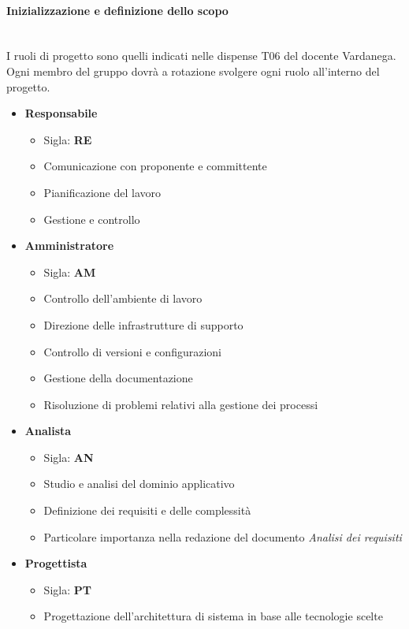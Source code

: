 \paragraph{Inizializzazione e definizione dello scopo}
\mbox{}\\
I ruoli di progetto sono quelli indicati nelle dispense T06 del docente Vardanega.
Ogni membro del gruppo dovrà a rotazione svolgere ogni ruolo all'interno del progetto.
\begin{itemize}
    \item \textbf{Responsabile}
    \begin{itemize}
        \item Sigla: \textbf{RE}
        \item Comunicazione con proponente e committente
        \item Pianificazione del lavoro
        \item Gestione e controllo
    \end{itemize}
    \item \textbf{Amministratore}
    \begin{itemize}
        \item Sigla: \textbf{AM}
        \item Controllo dell'ambiente di lavoro
        \item Direzione delle infrastrutture di supporto
        \item Controllo di versioni e configurazioni
        \item Gestione della documentazione
        \item Risoluzione di problemi relativi alla gestione dei processi
    \end{itemize}
    \item \textbf{Analista}
    \begin{itemize}
        \item Sigla: \textbf{AN}
        \item Studio e analisi del dominio applicativo
        \item Definizione dei requisiti e delle complessità
        \item Particolare importanza nella redazione del documento \textit{Analisi dei requisiti}
    \end{itemize}
    \item \textbf{Progettista}
    \begin{itemize}
        \item Sigla: \textbf{PT}
        \item Progettazione dell'architettura di sistema in base alle tecnologie scelte

\end{itemize}
\end{itemize}
